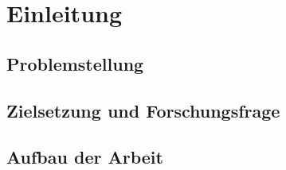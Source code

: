 \chapter{Einleitung}\label{chap:einleitung}

\section{Problemstellung}\label{sec:problemstellung}

\section{Zielsetzung und Forschungsfrage}\label{sec:zielsetzung}

\section{Aufbau der Arbeit}\label{sec:aufbau}
